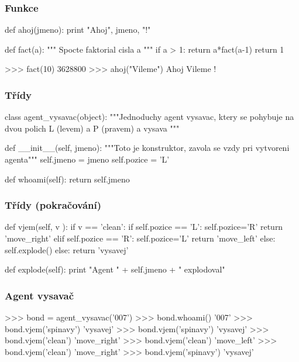 \documentclass[red,handout,professionalfont]{beamer}
\theoremstyle{definition}
\newcommand{\0}{\mbox{${\bf 0}$}}
\begin{document}
\begin{frame}[fragile]\frametitle{Funkce}
\begin{python}
def ahoj(jmeno):
  print "Ahoj", jmeno, "!"

def fact(a):
  """ Spocte faktorial cisla a """
  if a > 1:
    return a*fact(a-1)
  return 1
\end{python}\pause
\begin{python}
>>> fact(10)
3628800
>>> ahoj("Vileme")
Ahoj Vileme !
\end{python}
\end{frame}
\begin{frame}[fragile]\frametitle{Třídy}
\begin{python}
class agent_vysavac(object):
  """Jednoduchy agent vysavac, ktery se pohybuje na dvou polich L (levem) a P (pravem) a vysava """
  
  def __init__(self, jmeno):
    """Toto je konstruktor, zavola se vzdy pri vytvoreni agenta"""
    self.jmeno = jmeno
    self.pozice = 'L'
  
  def whoami(self):
    return self.jmeno
\end{python}
\end{frame}

\begin{frame}[fragile]\frametitle{Třídy (pokračování)}
\begin{python}
  def vjem(self, v ):
    if v == 'clean':
      if self.pozice == 'L':
        self.pozice='R'
        return 'move_right'
      elif self.pozice == 'R':
        self.pozice='L'
        return 'move_left'
      else:
        self.explode()
    else:
      return 'vysavej'

  def explode(self):
    print "Agent " + self.jmeno + " explodoval"
\end{python}
\end{frame}

\begin{frame}[fragile]\frametitle{Agent vysavač}
\begin{python}
>>> bond = agent_vysavac('007')
>>> bond.whoami()
'007'
>>> bond.vjem('spinavy')
'vysavej'
>>> bond.vjem('spinavy')
'vysavej'
>>> bond.vjem('clean')
'move_right'
>>> bond.vjem('clean')
'move_left'
>>> bond.vjem('clean')
'move_right'
>>> bond.vjem('spinavy')
'vysavej'
\end{python}
\end{frame}
\end{document}
